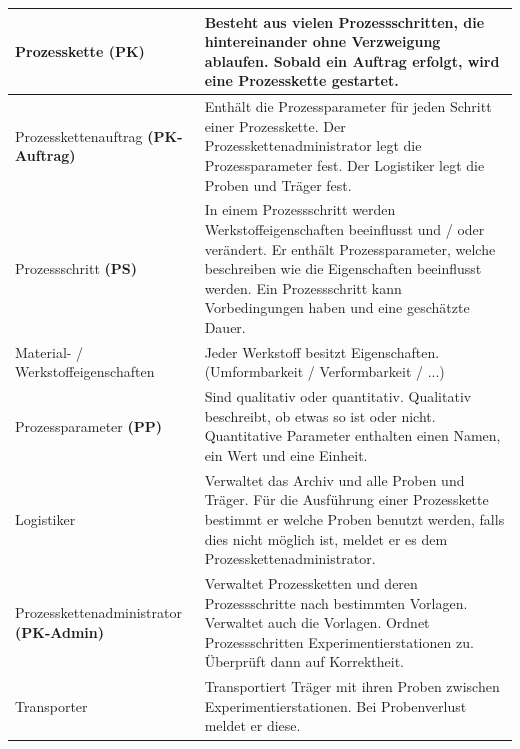 \documentclass[enabledeprecatedfontcommands,fontsize=12pt,paper=a4,twoside]{scrartcl}
\begin{document}
\begin{longtable}[c]{|p{7cm}|p{8cm}|}
Prozesskette \textbf{(PK)}                       & Besteht aus vielen Prozessschritten, die hintereinander ohne Verzweigung ablaufen. Sobald ein Auftrag erfolgt, wird eine Prozesskette gestartet.                                                                                                        \\ \hline
Prozesskettenauftrag \textbf{(PK-Auftrag)}     & Enthält die Prozessparameter für jeden Schritt einer Prozesskette. Der Prozesskettenadministrator legt die Prozessparameter fest. Der Logistiker legt die Proben und Träger fest.                                                                     \\ \hline
Prozessschritt \textbf{(PS)}                     & In einem Prozessschritt werden Werkstoffeigenschaften beeinflusst und / oder verändert. Er enthält Prozessparameter, welche beschreiben wie die Eigenschaften beeinflusst werden. Ein Prozessschritt kann Vorbedingungen haben und eine geschätzte Dauer. \\ \hline
Material- / Werkstoffeigenschaften                              & Jeder Werkstoff besitzt Eigenschaften. (Umformbarkeit / Verformbarkeit / ...)                                                                                                                                                                        \\ \hline
Prozessparameter \textbf{(PP)}                   & Sind qualitativ oder quantitativ. Qualitativ beschreibt, ob etwas so ist oder nicht. Quantitative Parameter enthalten einen Namen, ein Wert und eine Einheit.                                                                                          \\ \hline
Logistiker                                                      & Verwaltet das Archiv und alle Proben und Träger. Für die Ausführung einer Prozesskette bestimmt er welche Proben benutzt werden, falls dies nicht möglich ist, meldet er es dem Prozesskettenadministrator.                                           \\ \hline
Prozesskettenadministrator\textbf{ (PK-Admin)} & Verwaltet Prozessketten und deren Prozessschritte nach bestimmten Vorlagen. Verwaltet auch die Vorlagen. Ordnet Prozessschritten Experimentierstationen zu. Überprüft dann auf Korrektheit.                                                           \\ \hline
Transporter                                                     & Transportiert Träger mit ihren Proben zwischen Experimentierstationen. Bei Probenverlust meldet er diese.                                                                                                                                             \\ \hline

\end{longtable}
\end{document}
